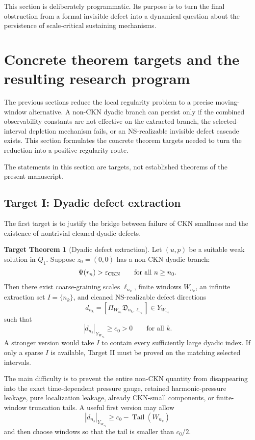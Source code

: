 \documentclass[11pt]{article}
\numberwithin{equation}{section}
\theoremstyle{plain}
\theoremstyle{definition}
\newtheorem{target}[theorem]{Target Theorem}
\theoremstyle{remark}
\begin{document}
This section is deliberately programmatic.  Its purpose is to turn the final obstruction from a formal invisible defect into a dynamical question about the persistence of scale-critical sustaining mechanisms.



\section{Concrete theorem targets and the resulting research program}
\label{sec:concrete-targets}

The previous sections reduce the local regularity problem to a precise
moving-window alternative.  A non-CKN dyadic branch can persist only if the
combined observability constants are not effective on the extracted branch, the
selected-interval depletion mechanism fails, or an NS-realizable invisible
defect cascade exists.  This section formulates the concrete theorem targets
needed to turn the reduction into a positive regularity route.

The statements in this section are targets, not established theorems of the
present manuscript.

\subsection{Target I: Dyadic defect extraction}

The first target is to justify the bridge between failure of CKN smallness and
the existence of nontrivial cleaned dyadic defects.

\begin{target}[Dyadic defect extraction]
\label{thm:target-defect-extraction}
Let \((u,p)\) be a suitable weak solution in \(Q_1\).  Suppose \(z_0=(0,0)\)
has a non-CKN dyadic branch:
\[
        \Psi(r_n)>\varepsilon_{\rm CKN}
        \qquad
        \text{for all }n\ge n_0.
\]
Then there exist coarse-graining scales \(\ell_{n_k}\), finite windows
\(W_{n_k}\), an infinite extraction set \(I=\{n_k\}\), and cleaned
NS-realizable defect directions
\[
        d_{n_k}=[\Pi_{W_{n_k}}\mathfrak D_{n_k,\ell_{n_k}}]\in Y_{W_{n_k}}
\]
such that
\[
        |d_{n_k}|_{Y_{W_{n_k}}}\ge c_0>0
        \qquad
        \text{for all }k.
\]
A stronger version would take \(I\) to contain every sufficiently large dyadic
index.  If only a sparse \(I\) is available, Target II must be proved on the
matching selected intervals.
\end{target}

The main difficulty is to prevent the entire non-CKN quantity from disappearing
into the exact time-dependent pressure gauge, retained harmonic-pressure leakage, pure localization leakage, already CKN-small
components, or finite-window truncation tails.  A useful first version may allow
\[
        |d_{n_k}|_{Y_{W_{n_k}}}\ge c_0-\operatorname{Tail}(W_{n_k})
\]
and then choose windows so that the tail is smaller than \(c_0/2\).
\end{document}
